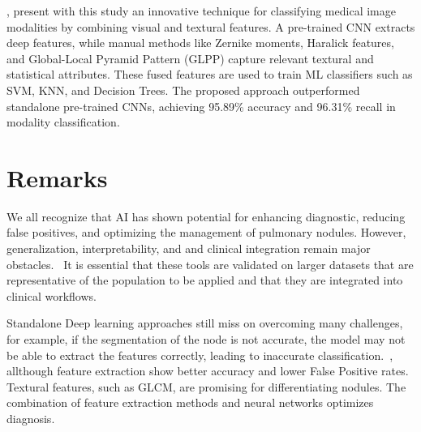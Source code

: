 \citet{Iqbal2023}, present with this study an innovative technique for classifying medical image modalities by combining visual and textural features. A pre-trained CNN extracts deep features, while manual methods like Zernike moments, Haralick features, and Global-Local Pyramid Pattern (GLPP) capture relevant textural and statistical attributes. These fused features are used to train ML classifiers such as SVM, KNN, and Decision Trees. The proposed approach outperformed standalone pre-trained CNNs, achieving 95.89\% accuracy and 96.31\% recall in modality classification.






\section{Remarks}
We all recognize that AI has shown potential for enhancing diagnostic, reducing false positives, and optimizing the management of pulmonary nodules. However, generalization, interpretability, and and clinical integration remain major obstacles.~\cite{ArtificialIntelligence2022} It is essential that these tools are validated on larger datasets that are representative of the population to be applied and that they are integrated into clinical workflows.~\cite{Wu2024}

Standalone Deep learning approaches still miss on overcoming many challenges, for example, if the segmentation of the node is not accurate, the model may not be able to extract the features correctly, leading to inaccurate classification.~\cite{Gu2021,Shaffie2021}, allthough feature extraction show better accuracy and lower False Positive rates. Textural features, such as GLCM, are promising for differentiating nodules. The combination of feature extraction methods and neural networks optimizes diagnosis.~\cite{Mathumetha2024}

